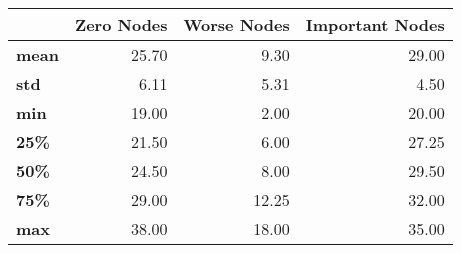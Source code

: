 \begin{tabular}{lrrr}
\toprule
{} &  Zero Nodes &  Worse Nodes &  Important Nodes \\
\midrule
\textbf{mean} &       25.70 &         9.30 &            29.00 \\
\textbf{std } &        6.11 &         5.31 &             4.50 \\
\textbf{min } &       19.00 &         2.00 &            20.00 \\
\textbf{25\% } &       21.50 &         6.00 &            27.25 \\
\textbf{50\% } &       24.50 &         8.00 &            29.50 \\
\textbf{75\% } &       29.00 &        12.25 &            32.00 \\
\textbf{max } &       38.00 &        18.00 &            35.00 \\
\bottomrule
\end{tabular}
